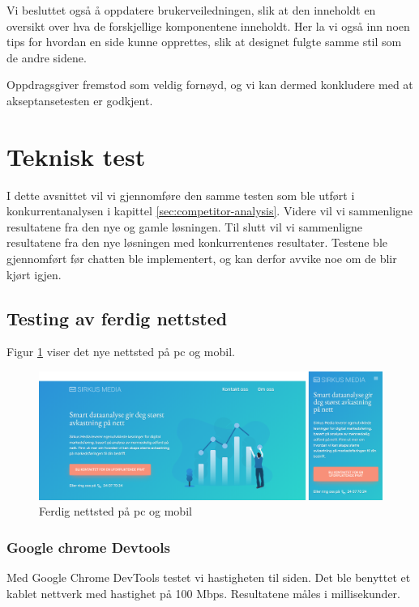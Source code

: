 Vi besluttet også å oppdatere brukerveiledningen, slik at den inneholdt en oversikt over hva de forskjellige komponentene inneholdt. Her la vi også inn noen tips for hvordan en side kunne opprettes, slik at designet fulgte samme stil som de andre sidene.

Oppdragsgiver fremstod som veldig fornøyd, og vi kan dermed konkludere med at akseptansetesten er godkjent.

\section{Teknisk test}
I dette avsnittet vil vi gjennomføre den samme testen som ble utført i konkurrentanalysen i kapittel \ref{sec:competitor-analysis}. Videre vil vi sammenligne resultatene fra den nye og gamle løsningen. Til slutt vil vi sammenligne resultatene fra den nye løsningen med konkurrentenes resultater. Testene ble gjennomført før chatten ble implementert, og kan derfor avvike noe om de blir kjørt igjen.

\subsection{Testing av ferdig nettsted}
Figur \ref{fig:analysis-new-website} viser det nye nettsted på pc og mobil.

\begin{figure}[H]
    \centering
    \includegraphics[width=\textwidth]{bereket/Nettsted-i-pc-og-mobil.png}
    \caption{Ferdig nettsted på pc og mobil}
    \label{fig:analysis-new-website}
\end{figure}

\subsubsection{Google chrome Devtools}
Med Google Chrome DevTools testet vi hastigheten til siden. Det ble benyttet et kablet nettverk med hastighet på 100 Mbps. Resultatene måles i millisekunder.

